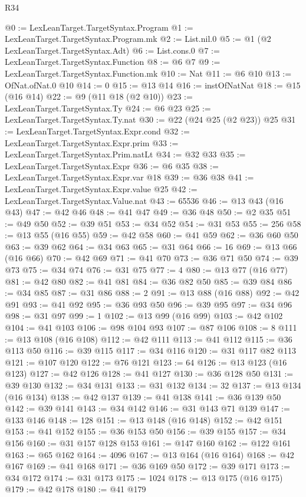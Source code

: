 \begin{lexlean}{R34}
\begin{coremodule}
@0 := LexLeanTarget.TargetSyntax.Program
@1 := LexLeanTarget.TargetSyntax.Program.mk
@2 := List.nil.{0}
@5 := @1 (@2 LexLeanTarget.TargetSyntax.Adt)
@6 := List.cons.{0}
@7 := LexLeanTarget.TargetSyntax.Function
@8 := @6 @7
@9 := LexLeanTarget.TargetSyntax.Function.mk
@10 := Nat
@11 := @6 @10
@13 := OfNat.ofNat.{0} @10
@14 := 0
@15 := @13 @14
@16 := instOfNatNat
@18 := @15 (@16 @14)
@22 := @9 (@11 @18 (@2 @10))
@23 := LexLeanTarget.TargetSyntax.Ty
@24 := @6 @23
@25 := LexLeanTarget.TargetSyntax.Ty.nat
@30 := @22 (@24 @25 (@2 @23)) @25
@31 := LexLeanTarget.TargetSyntax.Expr.cond
@32 := LexLeanTarget.TargetSyntax.Expr.prim
@33 := LexLeanTarget.TargetSyntax.Prim.natLt
@34 := @32 @33
@35 := LexLeanTarget.TargetSyntax.Expr
@36 := @6 @35
@38 := LexLeanTarget.TargetSyntax.Expr.var @18
@39 := @36 @38
@41 := LexLeanTarget.TargetSyntax.Expr.value @25
@42 := LexLeanTarget.TargetSyntax.Value.nat
@43 := 65536
@46 := @13 @43 (@16 @43)
@47 := @42 @46
@48 := @41 @47
@49 := @36 @48
@50 := @2 @35
@51 := @49 @50
@52 := @39 @51
@53 := @34 @52
@54 := @31 @53
@55 := 256
@58 := @13 @55 (@16 @55)
@59 := @42 @58
@60 := @41 @59
@62 := @36 @60 @50
@63 := @39 @62
@64 := @34 @63
@65 := @31 @64
@66 := 16
@69 := @13 @66 (@16 @66)
@70 := @42 @69
@71 := @41 @70
@73 := @36 @71 @50
@74 := @39 @73
@75 := @34 @74
@76 := @31 @75
@77 := 4
@80 := @13 @77 (@16 @77)
@81 := @42 @80
@82 := @41 @81
@84 := @36 @82 @50
@85 := @39 @84
@86 := @34 @85
@87 := @31 @86
@88 := 2
@91 := @13 @88 (@16 @88)
@92 := @42 @91
@93 := @41 @92
@95 := @36 @93 @50
@96 := @39 @95
@97 := @34 @96
@98 := @31 @97
@99 := 1
@102 := @13 @99 (@16 @99)
@103 := @42 @102
@104 := @41 @103
@106 := @98 @104 @93
@107 := @87 @106
@108 := 8
@111 := @13 @108 (@16 @108)
@112 := @42 @111
@113 := @41 @112
@115 := @36 @113 @50
@116 := @39 @115
@117 := @34 @116
@120 := @31 @117 @82 @113
@121 := @107 @120
@122 := @76 @121
@123 := 64
@126 := @13 @123 (@16 @123)
@127 := @42 @126
@128 := @41 @127
@130 := @36 @128 @50
@131 := @39 @130
@132 := @34 @131
@133 := @31 @132
@134 := 32
@137 := @13 @134 (@16 @134)
@138 := @42 @137
@139 := @41 @138
@141 := @36 @139 @50
@142 := @39 @141
@143 := @34 @142
@146 := @31 @143 @71 @139
@147 := @133 @146
@148 := 128
@151 := @13 @148 (@16 @148)
@152 := @42 @151
@153 := @41 @152
@155 := @36 @153 @50
@156 := @39 @155
@157 := @34 @156
@160 := @31 @157 @128 @153
@161 := @147 @160
@162 := @122 @161
@163 := @65 @162
@164 := 4096
@167 := @13 @164 (@16 @164)
@168 := @42 @167
@169 := @41 @168
@171 := @36 @169 @50
@172 := @39 @171
@173 := @34 @172
@174 := @31 @173
@175 := 1024
@178 := @13 @175 (@16 @175)
@179 := @42 @178
@180 := @41 @179

\end{coremodule}
\end{lexlean}
